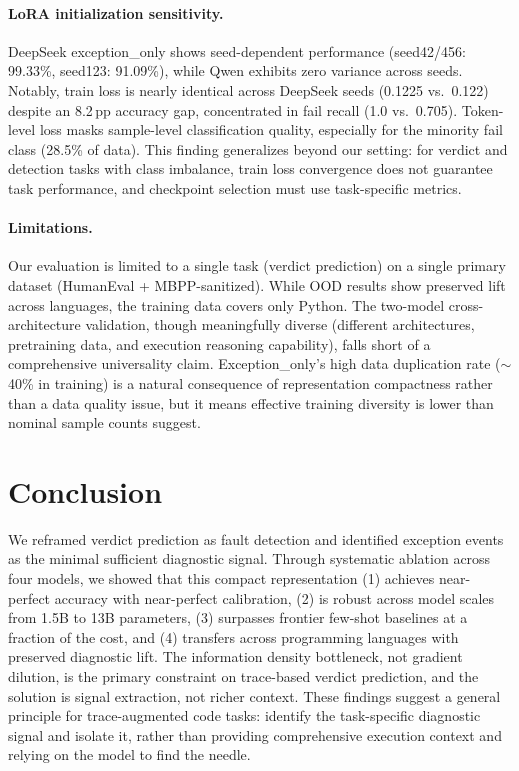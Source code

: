 \documentclass[11pt,a4paper]{article}
\newcommand{\pp}{\,pp}
\begin{document}
\paragraph{LoRA initialization sensitivity.}
DeepSeek exception\_only shows seed-dependent performance (seed42/456: 99.33\%, seed123: 91.09\%), while Qwen exhibits zero variance across seeds. Notably, train loss is nearly identical across DeepSeek seeds (0.1225 vs.\ 0.122) despite an 8.2\pp{} accuracy gap, concentrated in fail recall (1.0 vs.\ 0.705). Token-level loss masks sample-level classification quality, especially for the minority fail class (28.5\% of data). This finding generalizes beyond our setting: for verdict and detection tasks with class imbalance, train loss convergence does not guarantee task performance, and checkpoint selection must use task-specific metrics.

\paragraph{Limitations.}
Our evaluation is limited to a single task (verdict prediction) on a single primary dataset (HumanEval + MBPP-sanitized). While OOD results show preserved lift across languages, the training data covers only Python. The two-model cross-architecture validation, though meaningfully diverse (different architectures, pretraining data, and execution reasoning capability), falls short of a comprehensive universality claim. Exception\_only's high data duplication rate ($\sim$40\% in training) is a natural consequence of representation compactness rather than a data quality issue, but it means effective training diversity is lower than nominal sample counts suggest.

\section{Conclusion}
\label{sec:conclusion}

We reframed verdict prediction as fault detection and identified exception events as the minimal sufficient diagnostic signal. Through systematic ablation across four models, we showed that this compact representation (1) achieves near-perfect accuracy with near-perfect calibration, (2) is robust across model scales from 1.5B to 13B parameters, (3) surpasses frontier few-shot baselines at a fraction of the cost, and (4) transfers across programming languages with preserved diagnostic lift. The information density bottleneck, not gradient dilution, is the primary constraint on trace-based verdict prediction, and the solution is signal extraction, not richer context. These findings suggest a general principle for trace-augmented code tasks: identify the task-specific diagnostic signal and isolate it, rather than providing comprehensive execution context and relying on the model to find the needle.
\end{document}
